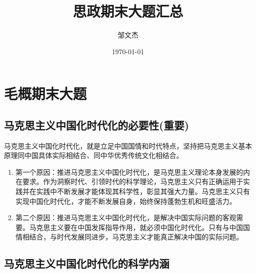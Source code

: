 \documentclass[12pt, a4paper, oneside]{ctexbook}
\title{{\Huge{\textbf{思政期末大题汇总}}}}
\author{邹文杰}
\date{\today}
\begin{document}
\maketitle

\setcounter{page}{1}




{}
\setcounter{page}{1}
\tableofcontents
\newpage
\setcounter{page}{1}

\chapter{毛概期末大题}

\section{马克思主义中国化时代化的必要性(重要)}

马克思主义中国化时代化，就是立足中国国情和时代特点，坚持把马克思主义基本原理同中国具体实际相结合、同中华优秀传统文化相结合。

\begin{enumerate}
\item 第一个原因：推进马克思主义中国化时代化，是马克思主义理论本身发展的内在要求。作为洞察时代、引领时代的科学理论，马克思主义只有正确运用于实践并在实践中不断发展才能体现其科学性，彰显其强大力量。马克思主义只有实现中国化时代化，才能不断发展自身，始终保持蓬勃生机和旺盛活力。
\item 第二个原因：推进马克思主义中国化时代化，是解决中国实际问题的客观需要。马克思主义要在中国发挥指导作用，就必须中国化时代化。只有与中国国情相结合，与时代发展同进步，马克思主义才能真正解决中国的实际问题。
\end{enumerate}

\section{马克思主义中国化时代化的科学内涵}
\end{document}
